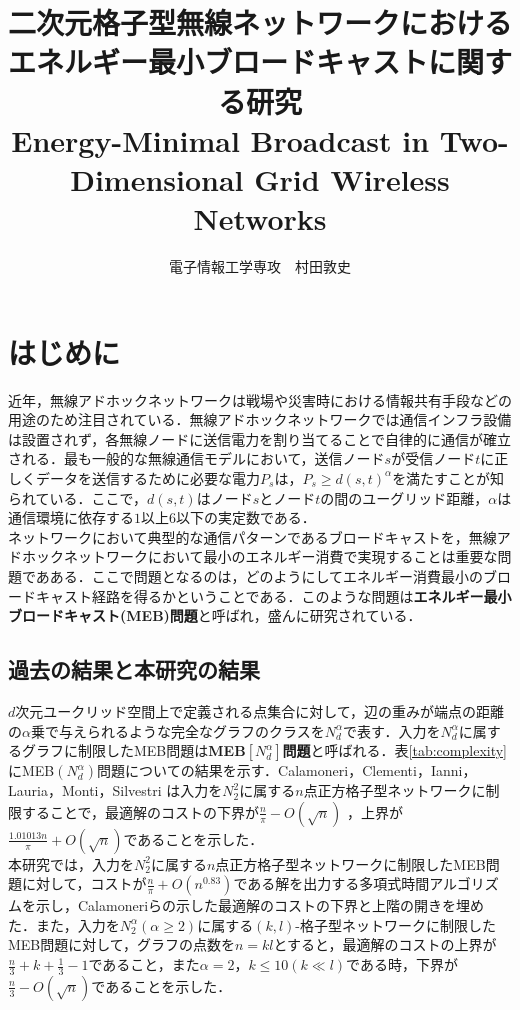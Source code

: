 \documentclass{classes/resume}
\title{
    \vspace{40pt}
    \LARGE
    二次元格子型無線ネットワークにおける\\
    エネルギー最小ブロードキャストに関する研究\\
    \Large Energy-Minimal Broadcast in Two-Dimensional Grid Wireless Networks
}
\author{
	\large 電子情報工学専攻　村田敦史
}
\begin{document}
\maketitle

\section{はじめに}
近年，無線アドホックネットワークは戦場や災害時における情報共有手段などの用途のため注目されている．無線アドホックネットワークでは通信インフラ設備は設置されず，各無線ノードに送信電力を割り当てることで自律的に通信が確立される．最も一般的な無線通信モデルにおいて，送信ノード$s$が受信ノード$t$に正しくデータを送信するために必要な電力$P_{s}$は，$P_{s} \ge d(s,t)^{\alpha}$を満たすことが知られている．ここで，$d(s,t)$はノード$s$とノード$t$の間のユーグリッド距離，$\alpha$は通信環境に依存する$1$以上$6$以下の実定数である．\\
\indent
ネットワークにおいて典型的な通信パターンであるブロードキャストを，無線アドホックネットワークにおいて最小のエネルギー消費で実現することは重要な問題であある．ここで問題となるのは，どのようにしてエネルギー消費最小のブロードキャスト経路を得るかということである．このような問題は\textbf{エネルギー最小ブロードキャスト(MEB)問題}と呼ばれ，盛んに研究されている．

\subsection{過去の結果と本研究の結果}
$d$次元ユークリッド空間上で定義される点集合に対して，辺の重みが端点の距離の$\alpha$乗で与えられるような完全なグラフのクラスを$N_{d}^{\alpha}$で表す．入力を$N_{d}^{\alpha}$に属するグラフに制限したMEB問題は\textbf{MEB$[N_{d}^{\alpha}]$問題}と呼ばれる．表\ref{tab:complexity}にMEB$(N_{d}^{\alpha})$問題についての結果を示す．Calamoneri，Clementi，Ianni，Lauria，Monti，Silvestri \cite{ref:calamoneri2008}は入力を$N_{2}^{2}$に属する$n$点正方格子型ネットワークに制限することで，最適解のコストの下界が$\frac{n}{\pi} - O(\sqrt{n})$ ，上界が$\frac{1.01013n}{\pi} + O(\sqrt{n})$であることを示した．\\
\indent
本研究では，入力を$N_{2}^{2}$に属する$n$点正方格子型ネットワークに制限したMEB問題に対して，コストが$\frac{n}{\pi} + O(n^{0.83})$である解を出力する多項式時間アルゴリズムを示し，Calamoneriら\cite{ref:calamoneri2008}の示した最適解のコストの下界と上階の開きを埋めた．また，入力を$N_{2}^{\alpha}(\alpha \ge 2)$に属する$(k,l)$-格子型ネットワークに制限したMEB問題に対して，グラフの点数を$n = kl$とすると，最適解のコストの上界が$\frac{n}{3} + k + \frac{1}{3} - 1$であること，また$\alpha = 2$，$k \leq 10(k \ll l)$である時，下界が$\frac{n}{3} - O(\sqrt{n})$であることを示した．\\
\end{document}
